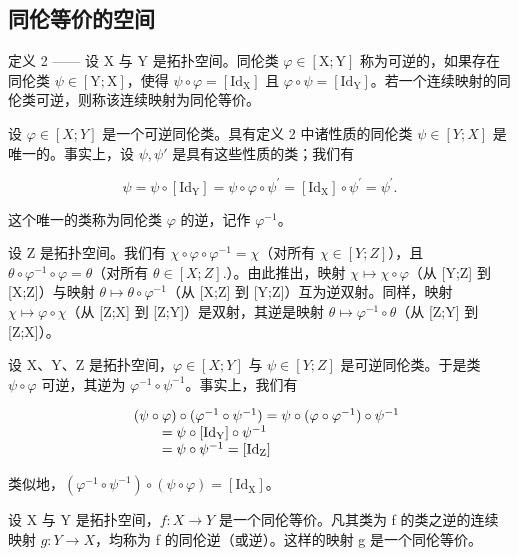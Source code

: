 \subsection{同伦等价的空间}

定义 2 —— 设 X 与 Y 是拓扑空间。同伦类 \(\varphi \in [\mathrm{X};\mathrm{Y}]\) 称为可逆的，如果存在同伦类 \(\psi \in [\mathrm{Y};\mathrm{X}]\)，使得 \(\psi \circ \varphi = [\mathrm{Id}_{\mathrm{X}}]\) 且 \(\varphi \circ \psi = [\mathrm{Id}_{\mathrm{Y}}]\)。若一个连续映射的同伦类可逆，则称该连续映射为同伦等价。

设 \(\varphi\in[X;Y]\) 是一个可逆同伦类。具有定义 2 中诸性质的同伦类 \(\psi\in[Y;X]\) 是唯一的。事实上，设 \(\psi,\psi'\) 是具有这些性质的类；我们有

\[
\psi = \psi \circ [ \mathrm{Id} _ {\mathrm{Y}} ] = \psi \circ \varphi \circ \psi^ {\prime} = [ \mathrm{Id} _ {\mathrm{X}} ] \circ \psi^ {\prime} = \psi^ {\prime}.
\]

这个唯一的类称为同伦类 \(\varphi\) 的逆，记作 \(\varphi^{-1}\)。

设 Z 是拓扑空间。我们有 \(\chi\circ\varphi\circ\varphi^{-1}=\chi\)（对所有 \(\chi\in[Y;Z]\)），且 \(\theta\circ\varphi^{-1}\circ\varphi=\theta\)（对所有 \(\theta\in[X;Z].\)）。由此推出，映射 \(\chi\mapsto\chi\circ\varphi\)（从 {[}Y;Z{]} 到 {[}X;Z{]}）与映射 \(\theta\mapsto\theta\circ\varphi^{-1}\)（从 {[}X;Z{]} 到 {[}Y;Z{]}）互为逆双射。同样，映射 \(\chi\mapsto\varphi\circ\chi\)（从 {[}Z;X{]} 到 {[}Z;Y{]}）是双射，其逆是映射 \(\theta\mapsto\varphi^{-1}\circ\theta\)（从 {[}Z;Y{]} 到 {[}Z;X{]}）。

设 X、Y、Z 是拓扑空间，\(\varphi \in [X;Y]\) 与 \(\psi \in [Y;Z]\) 是可逆同伦类。于是类 \(\psi \circ \varphi\) 可逆，其逆为 \(\varphi^{-1} \circ \psi^{-1}\)。事实上，我们有

\[
\begin{array}{r l} & (\psi \circ \varphi) \circ (\varphi^ {- 1} \circ \psi^ {- 1}) = \psi \circ (\varphi \circ \varphi^ {- 1}) \circ \psi^ {- 1} \\ & \qquad = \psi \circ [ \mathrm{Id} _ {\mathrm{Y}} ] \circ \psi^ {- 1} \\ & \qquad = \psi \circ \psi^ {- 1} = [ \mathrm{Id} _ {\mathrm{Z}} ] \end{array}
\]

类似地，\((\varphi^{-1} \circ \psi^{-1}) \circ (\psi \circ \varphi) = [\mathrm{Id}_{\mathrm{X}}]\)。

设 X 与 Y 是拓扑空间，\(f: X \to Y\) 是一个同伦等价。凡其类为 f 的类之逆的连续映射 \(g: Y \to X\)，均称为 f 的同伦逆（或逆）。这样的映射 g 是一个同伦等价。

